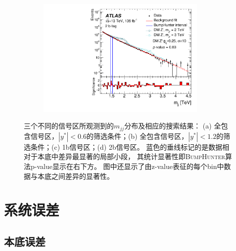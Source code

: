 \begin{figure}[htbp]
\begin{subfigure}{.5\textwidth}
  \caption{}
  \end{subfigure}
  \begin{subfigure}{.5\textwidth}
  \centering
  \includegraphics[width=0.9\textwidth]{figs/fig_03d.pdf}
  \caption{}
  \end{subfigure}
  \caption{
 三个不同的信号区所观测到的$m_{jj}$分布及相应的搜索结果：
(a) 全包含信号区，$|y^*|<0.6$的筛选条件；(b) 全包含信号区，$|y^*|<1.2$的筛选条件；(c) 1b信号区；(d) 2b信号区。
蓝色的垂线标记的是数据相对于本底中差异最显著的局部小段，
其统计显著性即\textsc{BumpHunter}算法p-value显示在右下方。
图中还显示了由z-value表征的每个bin中数据与本底之间差异的显著性。
   }
  \label{fig:dijetspectra}
\end{figure} 



\section{系统误差} 
\label{sec:DijetSys}


\subsection{本底误差} 
\label{sec:DijetSysBkg}

